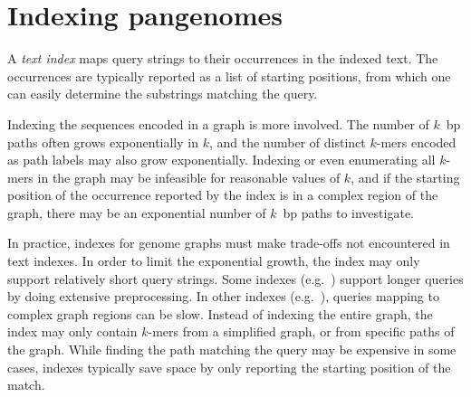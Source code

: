\begin{comment}
Adding more variants to the graph doesn't always improve mapping precision, however.
FORGe is a tool for modeling the effects of adding a variant to the graph \cite{Pritt_2018}. 
The primary benefit of adding a variant to the graph is that it increases the graph's representation of sequence diversity.
Without variance in the graph, reads with significant sequence dissimilarity from the linear genome won't be mapped to the correct region, or won't be mapped at all.
Sometimes, however, adding a variant can reduce alignment accuracy by increasing the ambiguity of similar sequences already in the graph.
In addition, adding variants to the graph can increase the cost of storing and querying the genome index.
To predict the effects of adding a variant, FORGe scores variants based on their frequency in a population, its proximity to other variants, and how it increases/decreases repetitive sequence in the genome.
It can then output a list of top-scoring variants for use in a graph aligner.
\todo{How do we square the results showing FORGe is needed with the results from our unpublished Graph Genomes manuscript? We don't do that work here.}
\end{comment}


\section{Indexing pangenomes} %

A \emph{text index} maps query strings to their occurrences in the indexed text.
The occurrences are typically reported as a list of starting positions, from which one can easily determine the substrings matching the query.

Indexing the sequences encoded in a graph is more involved.
The number of $k$~bp paths often grows exponentially in $k$, and the number of distinct $k$-mers encoded as path labels may also grow exponentially.
Indexing or even enumerating all $k$-mers in the graph may be infeasible for reasonable values of $k$, and if the starting position of the occurrence reported by the index is in a complex region of the graph, there may be an exponential number of $k$~bp paths to investigate.

In practice, indexes for genome graphs must make trade-offs not encountered in text indexes.
In order to limit the exponential growth, the index may only support relatively short query strings.
Some indexes (e.g.\ \cite{Siren_2014}) support longer queries by doing extensive preprocessing.
In other indexes (e.g.\ \cite{Thachuk_2013,Huang_2013,Maciuca_2016}), queries mapping to complex graph regions can be slow.
Instead of indexing the entire graph, the index may only contain $k$-mers from a simplified graph, or from specific paths of the graph.
While finding the path matching the query may be expensive in some cases, indexes typically save space by only reporting the starting position of the match.

